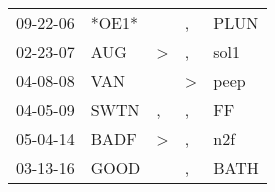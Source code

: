 \begin{supertabular}{p{0.07\textwidth}p{0.06\textwidth}p{0.02\textwidth}p{0.02\textwidth}p{0.06\textwidth}}
 09-22-06\textsuperscript{} &                   *OE1* &               &             , &  PLUN\textsuperscript{} \\
 02-23-07\textsuperscript{} &   AUG\textsuperscript{} &  \textgreater &             , &  sol1\textsuperscript{} \\
 04-08-08\textsuperscript{} &   VAN\textsuperscript{} &               &  \textgreater &  peep\textsuperscript{} \\
 04-05-09\textsuperscript{} &  SWTN\textsuperscript{} &             , &             , &    FF\textsuperscript{} \\
 05-04-14\textsuperscript{} &  BADF\textsuperscript{} &  \textgreater &             , &   n2f\textsuperscript{} \\
 03-13-16\textsuperscript{} &  GOOD\textsuperscript{} &               &             , &  BATH\textsuperscript{} \\
\end{supertabular}

